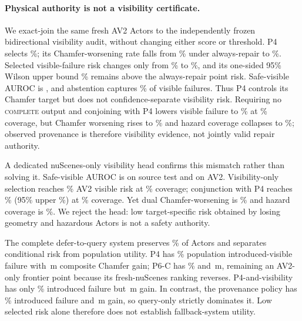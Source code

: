 \paragraph{Physical authority is not a visibility certificate.}
We exact-join the same \PtenActors{} fresh AV2 Actors to the independently frozen bidirectional visibility audit, without
changing either score or threshold. P4 selects \PtenPfourCoverage{}\%; its Chamfer-worsening rate falls from
\PtenAlwaysChamferWorse{}\% under always-repair to \PtenSelectedChamferWorse{}\%. Selected visible-failure risk changes only
from \PtenAlwaysVisibleRisk{}\% to \PtenSelectedVisibleRisk{}\%, and its one-sided 95\% Wilson upper bound
\PtenSelectedVisibleUpper{}\% remains above the always-repair point risk. Safe-visible AUROC is \PtenVisibleSafeAUROC{}, and
abstention captures \PtenVisibleCapture{}\% of visible failures. Thus P4 controls its Chamfer target but does not
confidence-separate visibility risk. Requiring no \textsc{complete} output and conjoining with P4 lowers visible failure to
\PelevenDualVisibleRisk{}\% at \PelevenDualCoverage{}\% coverage, but Chamfer worsening rises to
\PelevenDualChamferWorse{}\% and hazard coverage collapses to \PelevenDualHazardCoverage{}\%; observed provenance is therefore
visibility evidence, not jointly valid repair authority.

A dedicated nuScenes-only visibility head confirms this mismatch rather than solving it. Safe-visible AUROC is
\PtwelveSourceSafeAUROC{} on source test and \PtwelveExternalSafeAUROC{} on AV2. Visibility-only selection reaches
\PtwelveVisibilityRisk{}\% AV2 visible risk at \PtwelveVisibilityCoverage{}\% coverage; conjunction with P4 reaches
\PtwelveDualVisibleRisk{}\% (95\% upper \PtwelveDualVisibleUpper{}\%) at \PtwelveDualCoverage{}\% coverage. Yet dual
Chamfer-worsening is \PtwelveDualChamferWorse{}\% and hazard coverage is \PtwelveDualHazardCoverage{}\%. We reject the head:
low target-specific risk obtained by losing geometry and hazardous Actors is not a safety authority.

The complete defer-to-query system preserves \PthirteenActorRetention{}\% of Actors and separates conditional risk from
population utility. P4 has \PthirteenPfourPopulationVisible{}\% population introduced-visible failure with
\PthirteenPfourGain{}\,m composite Chamfer gain; P6-C has \PthirteenPsixPopulationVisible{}\% and
\PthirteenPsixGain{}\,m, remaining an AV2-only frontier point because its fresh-nuScenes ranking reverses. P4-and-visibility
has only \PthirteenDualPopulationVisible{}\% introduced failure but \PthirteenDualGain{}\,m gain. In contrast, the provenance
policy has \PthirteenProvenancePopulationVisible{}\% introduced failure and \PthirteenProvenanceGain{}\,m gain, so query-only
strictly dominates it. Low selected risk alone therefore does not establish fallback-system utility.


